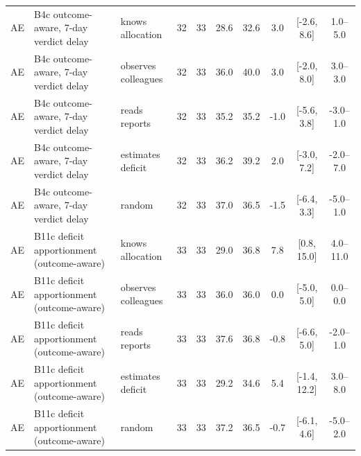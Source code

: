 \documentclass[10pt,onecolumn,letterpaper]{article}
\begin{document}
\begin{table}[!t]
\begin{tabular}{lllccccccc}
AE & B4c outcome-aware, 7-day verdict delay & knows allocation & 32 & 33 & 28.6 & 32.6 & 3.0 & [-2.6, 8.6] & 1.0--5.0 \\
AE & B4c outcome-aware, 7-day verdict delay & observes colleagues & 32 & 33 & 36.0 & 40.0 & 3.0 & [-2.0, 8.0] & 3.0--3.0 \\
AE & B4c outcome-aware, 7-day verdict delay & reads reports & 32 & 33 & 35.2 & 35.2 & -1.0 & [-5.6, 3.8] & -3.0--1.0 \\
AE & B4c outcome-aware, 7-day verdict delay & estimates deficit & 32 & 33 & 36.2 & 39.2 & 2.0 & [-3.0, 7.2] & -2.0--7.0 \\
AE & B4c outcome-aware, 7-day verdict delay & random & 32 & 33 & 37.0 & 36.5 & -1.5 & [-6.4, 3.3] & -5.0--1.0 \\
AE & B11c deficit apportionment (outcome-aware) & knows allocation & 33 & 33 & 29.0 & 36.8 & 7.8 & [0.8, 15.0] & 4.0--11.0 \\
AE & B11c deficit apportionment (outcome-aware) & observes colleagues & 33 & 33 & 36.0 & 36.0 & 0.0 & [-5.0, 5.0] & 0.0--0.0 \\
AE & B11c deficit apportionment (outcome-aware) & reads reports & 33 & 33 & 37.6 & 36.8 & -0.8 & [-6.6, 5.0] & -2.0--1.0 \\
AE & B11c deficit apportionment (outcome-aware) & estimates deficit & 33 & 33 & 29.2 & 34.6 & 5.4 & [-1.4, 12.2] & 3.0--8.0 \\
AE & B11c deficit apportionment (outcome-aware) & random & 33 & 33 & 37.2 & 36.5 & -0.7 & [-6.1, 4.6] & -5.0--2.0 \\
\bottomrule
\end{tabular}
\end{table}
\end{document}
